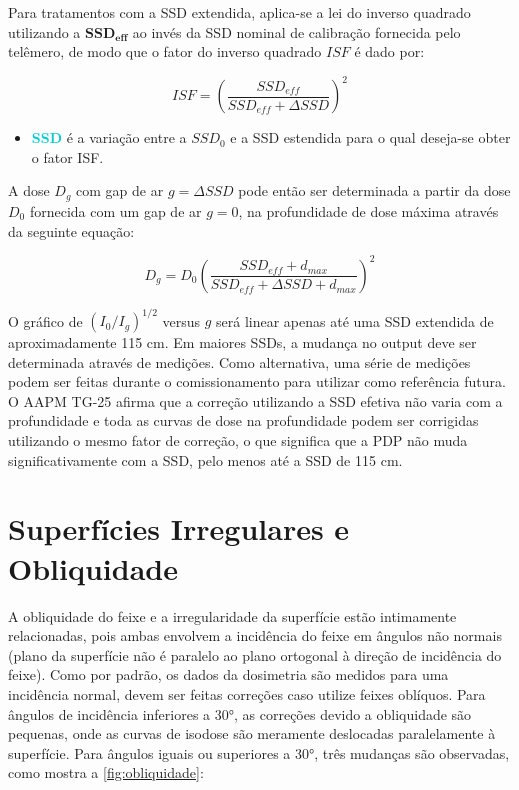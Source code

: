 \documentclass[11pt,a4paper]{article}
\newcounter{exemplo}
\begin{document}
	Para tratamentos com a SSD extendida, aplica-se a lei do inverso quadrado utilizando a $\mathbf{SSD_{eff}}$ ao invés da SSD nominal de calibração fornecida pelo telêmero, de modo que o fator do inverso quadrado $ISF$ é dado por:

	\begin{equation}
		ISF = \left(\frac{SSD_{eff}}{SSD_{eff} + \Delta SSD}\right)^2
	\end{equation}

	\begin{exemplo}[onde,]
		\begin{itemize}
			\item \textcolor{DarkTurquoise}{\textbf{\Delta SSD}} é a variação entre a $SSD_0$ e a SSD estendida para o qual deseja-se obter o fator ISF.
		\end{itemize}
	\end{exemplo}

	A dose $D_g$ com gap de ar $g = \Delta SSD$ pode então ser determinada a partir da dose $D_0$ fornecida com um gap de ar $g = 0$, na profundidade de dose máxima através da seguinte equação:

	\begin{equation}
		D_g = D_0 \left(\frac{SSD_{eff} + d_{max}}{SSD_{eff} + \Delta SSD + d_{max} }\right)^2
	\end{equation}
	
	O gráfico de $(I_0/I_g)^{1/2}$ versus $g$ será linear apenas até uma SSD extendida de aproximadamente 115 cm. Em maiores SSDs, a mudança no output deve ser determinada através de medições. Como alternativa, uma série de medições podem ser feitas durante o comissionamento para utilizar como referência futura. O AAPM TG-25 afirma que a correção utilizando a SSD efetiva não varia com a profundidade e toda as curvas de dose na profundidade podem ser corrigidas utilizando o mesmo fator de correção, o que significa que a PDP não muda significativamente com a SSD, pelo menos até a SSD de 115 cm.

\section{Superfícies Irregulares e Obliquidade}

	A obliquidade do feixe e a irregularidade da superfície estão intimamente relacionadas, pois ambas envolvem a incidência do feixe em ângulos não normais (plano da superfície não é paralelo ao plano ortogonal à direção de incidência do feixe). Como por padrão, os dados da dosimetria são medidos para uma incidência normal, devem ser feitas correções caso utilize feixes oblíquos. Para ângulos de incidência inferiores a \ang{30}, as correções devido a obliquidade são pequenas, onde as curvas de isodose são meramente deslocadas paralelamente à superfície. Para ângulos iguais ou superiores a \ang{30}, três mudanças são observadas, como mostra a \ref{fig:obliquidade}:
\end{document}
